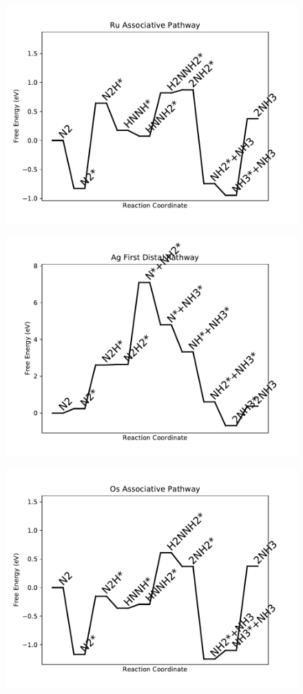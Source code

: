 \begin{figure}
\centering
\includegraphics[width=0.8\linewidth]{data/plots/Ru_associative.pdf}
\end{figure}

\begin{figure}
\centering
\includegraphics[width=0.8\linewidth]{data/plots/Ag_distal_1.pdf}
\end{figure}

\begin{figure}
\centering
\includegraphics[width=0.8\linewidth]{data/plots/Os_associative.pdf}
\end{figure}

